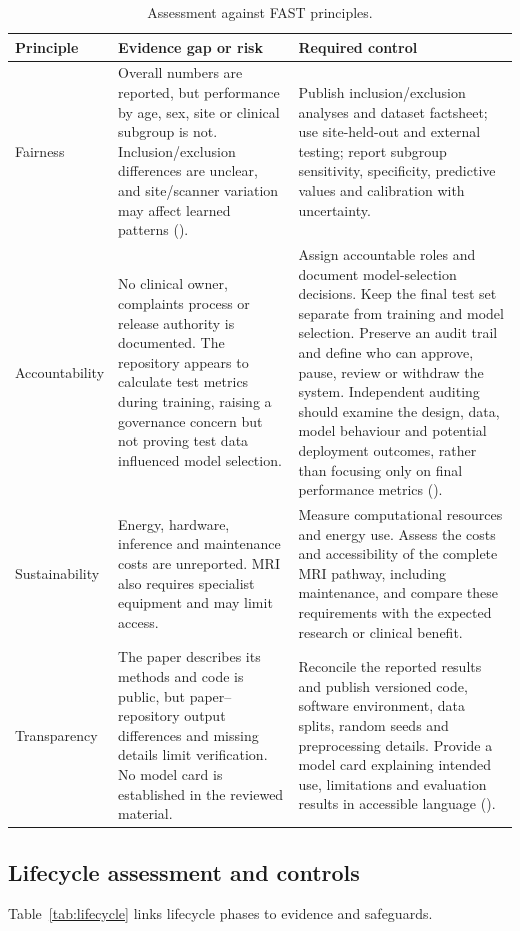 \documentclass[11pt,a4paper]{article}
\begin{document}
\begin{table}[H]
\centering
\caption{Assessment against FAST principles.}
\label{tab:fast}
\small
\begin{tabularx}{\textwidth}{p{2.1cm}Y Y}
\toprule
\textbf{Principle} & \textbf{Evidence gap or risk} & \textbf{Required control}\\
\midrule
Fairness & Overall numbers are reported, but performance by age, sex, site or clinical subgroup is not. Inclusion/exclusion differences are unclear, and site/scanner variation may affect learned patterns (\cite{abraham2017,mehrabi2021}). & Publish inclusion/exclusion analyses and dataset factsheet; use site-held-out and external testing; report subgroup sensitivity, specificity, predictive values and calibration with uncertainty.\\
Accountability & No clinical owner, complaints process or release authority is documented. The repository appears to calculate test metrics during training, raising a governance concern but not proving test data influenced model selection. & Assign accountable roles and document model-selection decisions. Keep the final test set separate from training and model selection. Preserve an audit trail and define who can approve, pause, review or withdraw the system. Independent auditing should examine the design, data, model behaviour and potential deployment outcomes, rather than focusing only on final performance metrics (\cite{raji2020}).\\
Sustainability & Energy, hardware, inference and maintenance costs are unreported. MRI also requires specialist equipment and may limit access. & Measure computational resources and energy use. Assess the costs and accessibility of the complete MRI pathway, including maintenance, and compare these requirements with the expected research or clinical benefit.\\
Transparency & The paper describes its methods and code is public, but paper--repository output differences and missing details limit verification. No model card is established in the reviewed material. & Reconcile the reported results and publish versioned code, software environment, data splits, random seeds and preprocessing details. Provide a model card explaining intended use, limitations and evaluation results in accessible language (\cite{mitchell2019}).\\
\bottomrule
\end{tabularx}
\end{table}


\subsection{Lifecycle assessment and controls}
Table~\ref{tab:lifecycle} links lifecycle phases to evidence and safeguards.
\end{document}

